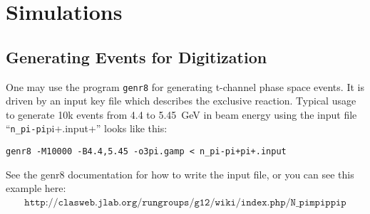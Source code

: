 \section{\label{sec:sim}Simulations}

\subsection{\label{sec:sim.gen}Generating Events for Digitization}

One may use the program \texttt{genr8} for generating t-channel phase space events. It is driven by an input key file which describes the exclusive reaction. Typical usage to generate 10k events from 4.4 to 5.45~GeV in beam energy using the input file ``\verb+n_pi-pi+pi+.input+'' looks like this:
\begin{verbatim}
genr8 -M10000 -B4.4,5.45 -o3pi.gamp < n_pi-pi+pi+.input
\end{verbatim}
See the genr8 documentation for how to write the input file, or you can see this example here:
\begin{align}
    \texttt{http://clasweb.jlab.org/rungroups/g12/wiki/index.php/N\_pimpippip} \nonumber
\end{align}

